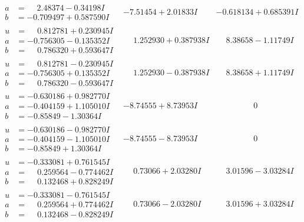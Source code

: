 \documentclass[1p]{elsarticle_modified}
\theoremstyle{definition}
\begin{document}
$$\begin{array}{c|c|c}
\begin{aligned}
a &= \phantom{-}2.48374 - 0.34198 I \\
b &= -0.709497 + 0.587590 I\end{aligned}
 & -7.51454 + 2.01833 I & -0.618134 + 0.685391 I \\ \hline\begin{aligned}
u &= \phantom{-}0.812781 + 0.230945 I \\
a &= -0.756305 - 0.135352 I \\
b &= \phantom{-}0.786320 + 0.593647 I\end{aligned}
 & \phantom{-}1.252930 + 0.387938 I & \phantom{-}8.38658 - 1.11749 I \\ \hline\begin{aligned}
u &= \phantom{-}0.812781 - 0.230945 I \\
a &= -0.756305 + 0.135352 I \\
b &= \phantom{-}0.786320 - 0.593647 I\end{aligned}
 & \phantom{-}1.252930 - 0.387938 I & \phantom{-}8.38658 + 1.11749 I \\ \hline\begin{aligned}
u &= -0.630186 + 0.982770 I \\
a &= -0.404159 + 1.105010 I \\
b &= -0.85849 - 1.30364 I\end{aligned}
 & -8.74555 + 8.73953 I & \phantom{-0.000000 } 0 \\ \hline\begin{aligned}
u &= -0.630186 - 0.982770 I \\
a &= -0.404159 - 1.105010 I \\
b &= -0.85849 + 1.30364 I\end{aligned}
 & -8.74555 - 8.73953 I & \phantom{-0.000000 } 0 \\ \hline\begin{aligned}
u &= -0.333081 + 0.761545 I \\
a &= \phantom{-}0.259564 - 0.774462 I \\
b &= \phantom{-}0.132468 + 0.828249 I\end{aligned}
 & \phantom{-}0.73066 + 2.03280 I & \phantom{-}3.01596 - 3.03284 I \\ \hline\begin{aligned}
u &= -0.333081 - 0.761545 I \\
a &= \phantom{-}0.259564 + 0.774462 I \\
b &= \phantom{-}0.132468 - 0.828249 I\end{aligned}
 & \phantom{-}0.73066 - 2.03280 I & \phantom{-}3.01596 + 3.03284 I \\ \hline\begin{aligned}

\end{aligned}
\end{array}$$
\end{document}
